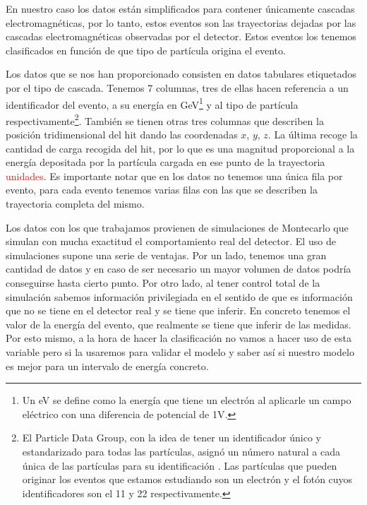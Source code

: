 \documentclass[a4paper,12pt,twoside,titlepage]{article}
\newcommand{\red}[1]{\textcolor{red}{#1}}
\begin{document}
En nuestro caso los datos están simplificados para contener únicamente cascadas electromagnéticas, por lo tanto, estos eventos son las trayectorias dejadas por las cascadas electromagnéticas observadas por el detector. Estos eventos los tenemos clasificados en función de que tipo de partícula origina el evento.


Los datos que se nos han proporcionado consisten en datos tabulares etiquetados por el tipo de cascada. Tenemos 7 columnas, tres de ellas hacen referencia a un identificador del evento, a su energía en GeV\footnote{Un eV se define como la energía que tiene un electrón al aplicarle un campo eléctrico con una diferencia de potencial de 1V.} y al tipo de partícula respectivamente\footnote{El Particle Data Group, con la idea de tener un identificador único y estandarizado para todas las partículas, asignó un número natural a cada única de las partículas para su identificación \cite{datagroup}. Las partículas que pueden originar los eventos que estamos estudiando son un electrón y el fotón cuyos identificadores son el 11 y 22 respectivamente.}.  También se tienen otras tres columnas que describen la posición tridimensional del hit dando las coordenadas $x$, $y$, $z$. La última recoge la cantidad de carga recogida del hit, por lo que es una magnitud proporcional a la energía depositada por la partícula cargada en ese punto de la trayectoria \red{unidades}. Es importante notar que en los datos no tenemos una única fila por evento, para cada evento tenemos varias filas con las que se describen la trayectoria completa del mismo.

Los datos con los que trabajamos provienen de simulaciones de Montecarlo que simulan con mucha exactitud el comportamiento real del detector. El uso de simulaciones supone una serie de ventajas. Por un lado, tenemos una gran cantidad de datos y en caso de ser necesario un mayor volumen de datos podría conseguirse hasta cierto punto. Por otro lado, al tener control total de la simulación sabemos información privilegiada en el sentido de que es información que no se tiene en el detector real y se tiene que inferir. En concreto tenemos el valor de la energía del evento, que realmente se tiene que inferir de las medidas. Por esto mismo, a la hora de hacer la clasificación no vamos a hacer uso de esta variable pero si la usaremos para validar el modelo y saber así si nuestro modelo es mejor para un intervalo de energía concreto.
\end{document}
